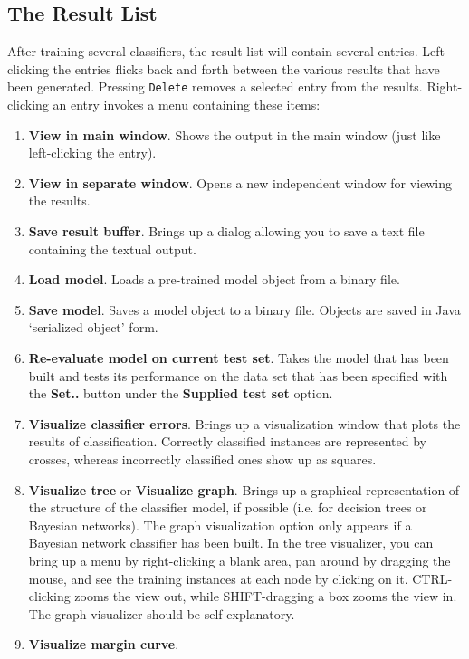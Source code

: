 \documentclass[a4paper]{article}
\begin{document}
\subsection{The Result List}

After training several classifiers, the result list will contain several
entries.  Left-clicking the entries flicks back and forth between the various
results that have been generated. Pressing \texttt{Delete} removes a selected 
entry from the results. Right-clicking an entry invokes a menu containing these items:

\begin{enumerate}
\item \textbf{View in main window}.
Shows the output in the main window (just like left-clicking the entry).
\item \textbf{View in separate window}.
Opens a new independent window for viewing the results.
\item \textbf{Save result buffer}.
Brings up a dialog allowing you to save a text file containing the textual
output.
\item \textbf{Load model}.
Loads a pre-trained model object from a binary file.
\item \textbf{Save model}.
Saves a model object to a binary file. Objects are saved in Java `serialized
object' form.
\item \textbf{Re-evaluate model on current test set}.
Takes the model that has been built and tests its performance on the data set
that has been specified with the \textbf{Set..} button under the
\textbf{Supplied test set} option.
\item \textbf{Visualize classifier errors}.
Brings up a visualization window that plots the results of classification.
Correctly classified instances are represented by crosses, whereas incorrectly
classified ones show up as squares.
\item \textbf{Visualize tree} or \textbf{Visualize graph}.  Brings up
a graphical representation of the structure of the classifier model,
if possible (i.e. for decision trees or Bayesian networks). The
graph visualization option only appears if a Bayesian network
classifier has been built. In the tree visualizer, you can bring up a
menu by right-clicking a blank area, pan around by dragging the mouse,
and see the training instances at each node by clicking on
it. CTRL-clicking zooms the view out, while SHIFT-dragging a box zooms
the view in. The graph visualizer should be self-explanatory.
\item \textbf{Visualize margin curve}.

\end{enumerate}
\end{document}
